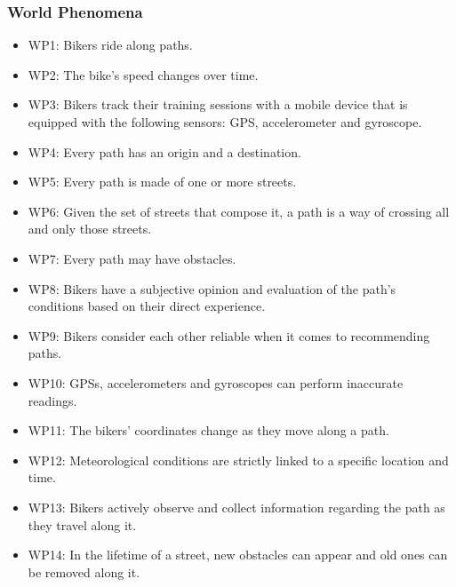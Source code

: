 \documentclass{article}
\begin{document}
\subsubsection{World Phenomena}
\begin{itemize}
    \item WP1: Bikers ride along paths. 
    \item WP2: The bike’s speed changes over time. 
    \item WP3: Bikers track their training sessions with a mobile device that is equipped with the following sensors: GPS, accelerometer and gyroscope. 
    \item WP4: Every path has an origin and a destination. 
    \item WP5: Every path is made of one or more streets. 
    \item WP6: Given the set of streets that compose it, a path is a way of crossing all and only those streets.
    \item WP7: Every path may have obstacles.
    \item WP8: Bikers have a subjective opinion and evaluation of the path’s conditions based on their direct experience.
    \item WP9: Bikers consider each other reliable when it comes to recommending paths.
    \item WP10: GPSs, accelerometers and gyroscopes can perform inaccurate readings.
    \item WP11: The bikers’ coordinates change as they move along a path.
    \item WP12: Meteorological conditions are strictly linked to a specific location and time.
    \item WP13: Bikers actively observe and collect information regarding the path as they travel along it. 
    \item WP14: In the lifetime of a street, new obstacles can appear and old ones can be removed along it.
\end{itemize}
\end{document}
